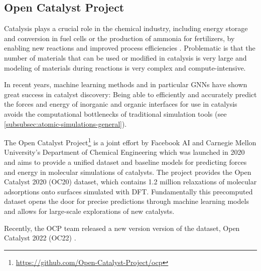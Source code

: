 \subsection{Open Catalyst Project}

Catalysis plays a crucial role in the chemical industry, including energy storage and conversion in 
fuel cells or the production of ammonia for fertilizers, by enabling new reactions and improved 
process efficiencies \cite{Chanussot_2021}. Problematic is that the number of materials that can 
be used or modified in catalysis is very large and modeling of materials during reactions is very 
complex and compute-intensive.

In recent years, machine learning methods and in particular GNNs have shown great success in 
catalyst discovery: Being able to efficiently and accurately predict the 
forces and energy of inorganic and organic interfaces for use in catalysis avoids the 
computational bottlenecks of traditional simulation tools (see \ref{subsubsec:atomic-simulations-general}). 

The Open Catalyst Project\footnote{\url{https://github.com/Open-Catalyst-Project/ocp}} \cite*{Chanussot_2021} is a joint effort by Facebook AI and Carnegie Mellon 
University's Department of Chemical Engineering which was launched in 2020 and 
aims to provide a unified dataset and baseline models for predicting forces and energy in molecular 
simulations of catalysts. The project provides the Open Catalyst 2020 (OC20) dataset, which contains 
1.2 million relaxations of molecular adsorptions onto surfaces simulated with DFT. Fundamentally this 
precomputed dataset opens the door for precise predictions through machine learning models and allows
for large-scale explorations of new catalysts.

Recently, the OCP team released a new version version of the dataset, Open Catalyst 2022 (OC22) 
\cite{https://doi.org/10.48550/arxiv.2206.08917}.